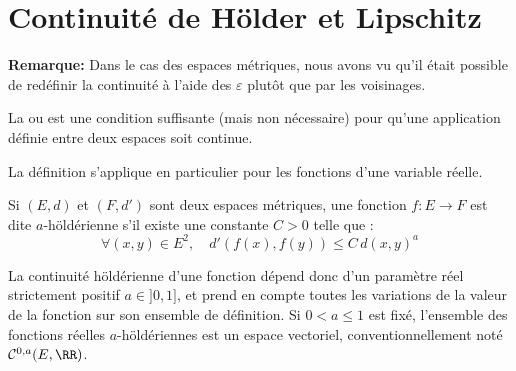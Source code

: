 \medskip
\section{Continuité de Hölder et Lipschitz}%

\textbf{Remarque:}
Dans le cas des espaces métriques, nous avons vu qu'il était possible
de redéfinir la continuité à l'aide des $\varepsilon$ plutôt que
par les voisinages.

\bigskip
{}
\medskip
La  ou 
est une condition suffisante (mais non nécessaire) pour qu'une application définie entre
deux espaces  soit continue.

La définition s'applique en particulier pour les fonctions d'une variable réelle.

\medskip
\begin{definition}
Si $(E, d)$ et $(F, d')$ sont deux espaces métriques, une fonction $f : E \rightarrow F$ est dite
$a$-höldérienne s'il existe une constante $C > 0$ telle que :
\begin{equation}
    \forall (x, y) \in E^2,\quad d'\left(f(x), f(y)\right) \le C\,d\left(x,y\right)^a
\end{equation}
\end{definition}
\medskip
La continuité höldérienne d'une fonction dépend donc d'un paramètre réel
strictement positif $a \in ]0, 1]$, et prend en compte toutes les variations de la valeur de
la fonction sur son ensemble de définition.
\medskip
Si $0 < a \leq1$ est fixé, l'ensemble des fonctions réelles $a$-höldériennes est un
espace vectoriel, conventionnellement noté $\mathcal{C}^{0, a}(E,\RR)$.

